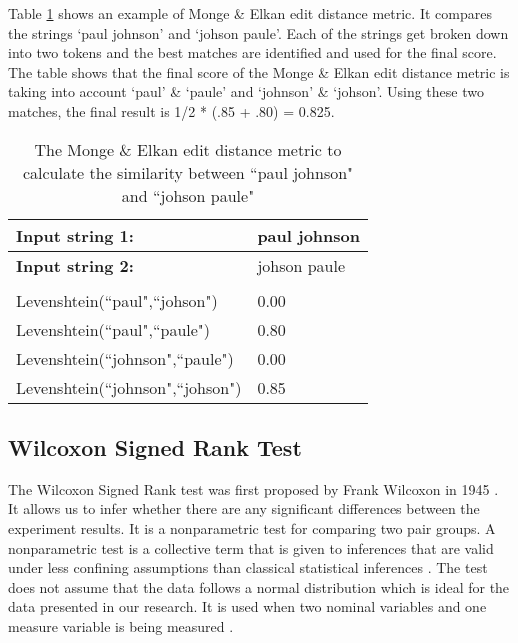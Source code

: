 Table \ref{mongeTable} shows an example of Monge \& Elkan edit distance metric. It compares the strings `paul johnson' and `johson paule'. Each of the strings get broken down into two tokens and the best matches are identified and used for the final score. The table shows that the final score of the Monge \& Elkan edit distance metric is taking into account `paul' \& `paule' and `johnson' \& `johson'. Using these two matches, the final result is 1/2 * (.85 + .80) = 0.825.

\begin{table}[H]
\centering

\begin{tabular}{|l|l|}
\hline
\textbf{Input string 1:}        & paul johnson \\ \hline
\textbf{Input string 2:}        & johson paule \\ \hline
                                &              \\ \hline
Levenshtein(``paul",``johson")    & 0.00         \\ \hline
Levenshtein(``paul",``paule")     & 0.80         \\ \hline
Levenshtein(``johnson",``paule")  & 0.00         \\ \hline
Levenshtein(``johnson",``johson") & 0.85         \\ \hline
\end{tabular}
\caption{The Monge \& Elkan edit distance metric to calculate the similarity between ``paul johnson" and ``johson paule"}
\label{mongeTable}
\end{table}



\subsection{Wilcoxon Signed Rank Test}

The Wilcoxon Signed Rank test was first proposed by Frank Wilcoxon in 1945 \cite{wilcoxon1945individual}. It allows us to infer whether there are any significant differences between the experiment results. It is a nonparametric test for comparing two pair groups. A nonparametric test is a collective term that is given to inferences that are valid under less confining assumptions than classical statistical inferences \cite{nonparametric}. The test does not assume that the data follows a normal distribution which is ideal for the data presented in our research. It is used when two nominal variables and one measure variable is being measured \cite{mcdonald2009handbook}.

